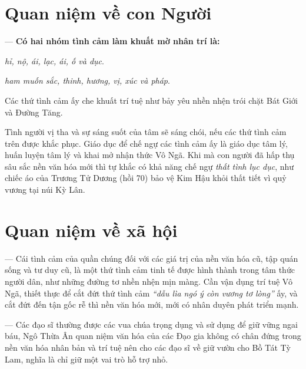 \section{Quan niệm về con Người} %
\label{sec:72_73_con_nguoi}

— {\bf Có hai nhóm tình cảm làm khuất mờ nhân trí là:}

\begin{description}[leftmargin=!,labelwidth=\widthof{\bfseries Thất tình:}]
    \item[Thất tình:] \emph{hỉ, nộ, ái, lạc, ái, ố và dục}.

    \item[Lục dục:] \emph{ham muốn sắc, thinh, hương, vị, xúc và pháp}.
\end{description}

Các thứ tình cảm ấy che khuất trí tuệ như bảy yêu nhền nhện trói chặt Bát Giới và Đường Tăng.

Tình người vị tha và sự sáng suốt của tâm sẽ sáng chói, nếu các thứ tình cảm trên được khắc phục. Giáo dục để chế ngự các tình cảm ấy là giáo dục tâm lý, huấn luyện tâm lý và khai mở nhận thức Vô Ngã. Khi mà con người đã hấp thụ sâu sắc nền văn hóa mới thì tự khắc có khả năng chế ngự \emph{thất tình lục dục}, như chiếc áo của Trương Tử Dương (hồi 70) bảo vệ Kim Hậu khỏi thất tiết vì quỷ vương tại núi Kỳ Lân.

\section{Quan niệm về xã hội} %
\label{sec:72_73_xa_hoi}

— Cái tình cảm của quần chúng đối với các giá trị của nền văn hóa cũ, tập quán sống và tư duy cũ, là một thứ tình cảm tinh tế được hình thành trong tâm thức người dân, như những đường tơ nhền nhện mịn màng. Cần vận dụng trí tuệ Vô Ngã, thiết thực để cắt đứt thứ tình cảm \emph{``dẫu lìa ngó ý còn vương tơ lòng''} ấy, và cắt đứt đến tận gốc rễ thì nền văn hóa mới, mới có nhân duyên phát triển mạnh.

— Các đạo sĩ thường được các vua chúa trọng dụng và sử dụng để giữ vững ngai báu, Ngô Thừa Ân quan niệm văn hóa của các Đạo gia không có chân đứng trong nền văn hóa nhân bản và trí tuệ nên cho các đạo sĩ về giữ vườn cho Bồ Tát Tỳ Lam, nghĩa là chỉ giữ một vai trò hỗ trợ nhỏ.
